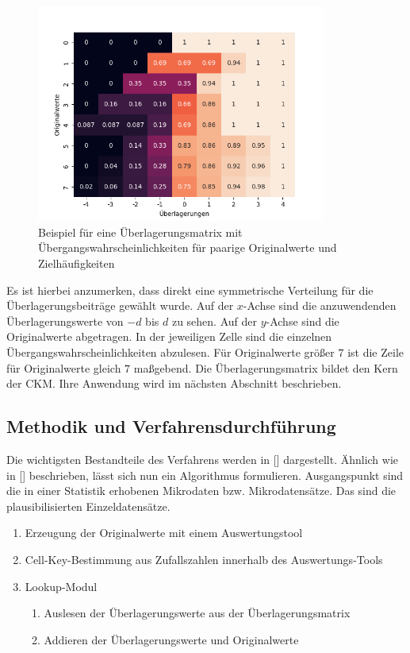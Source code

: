 \begin{figure}[H]
    \begin{center}
        \includegraphics[width=0.85\textwidth]{img/matrix.png}
        \caption{Beispiel für eine Überlagerungsmatrix mit Übergangswahrscheinlichkeiten für paarige Originalwerte und Zielhäufigkeiten}
        \label{matrix_plot}
    \end{center}
\end{figure}

Es ist hierbei anzumerken, dass direkt eine symmetrische Verteilung für die Überlagerungsbeiträge gewählt wurde. Auf der $x$-Achse sind die anzuwendenden Überlagerungswerte von $-d$ bis $d$ zu sehen. Auf der $y$-Achse sind die Originalwerte abgetragen. In der jeweiligen Zelle sind die einzelnen Übergangswahrscheinlichkeiten abzulesen. Für Originalwerte  grö\ss er $7$ ist die Zeile für Originalwerte gleich $7$ ma\ss gebend. Die Überlagerungsmatrix bildet den Kern der CKM. Ihre Anwendung wird im nächsten Abschnitt beschrieben.


\subsection{Methodik und Verfahrensdurchführung}%

Die wichtigsten Bestandteile des Verfahrens werden in [\cite{Enderle}] dargestellt. Ähnlich wie in [\cite{Wipke}] beschrieben, lässt sich nun ein Algorithmus formulieren. Ausgangspunkt sind die in einer Statistik erhobenen Mikrodaten bzw. Mikrodatensätze. Das sind die plausibilisierten Einzeldatensätze. 

\begin{enumerate}
    \item Erzeugung der Originalwerte mit einem Auswertungstool
    \item Cell-Key-Bestimmung aus Zufallszahlen innerhalb des Auswertungs-Tools
    \item Lookup-Modul
    \begin{enumerate}
        \item Auslesen der Überlagerungswerte aus der Überlagerungsmatrix
        \item Addieren der Überlagerungswerte und Originalwerte
    \end{enumerate}
\end{enumerate}


